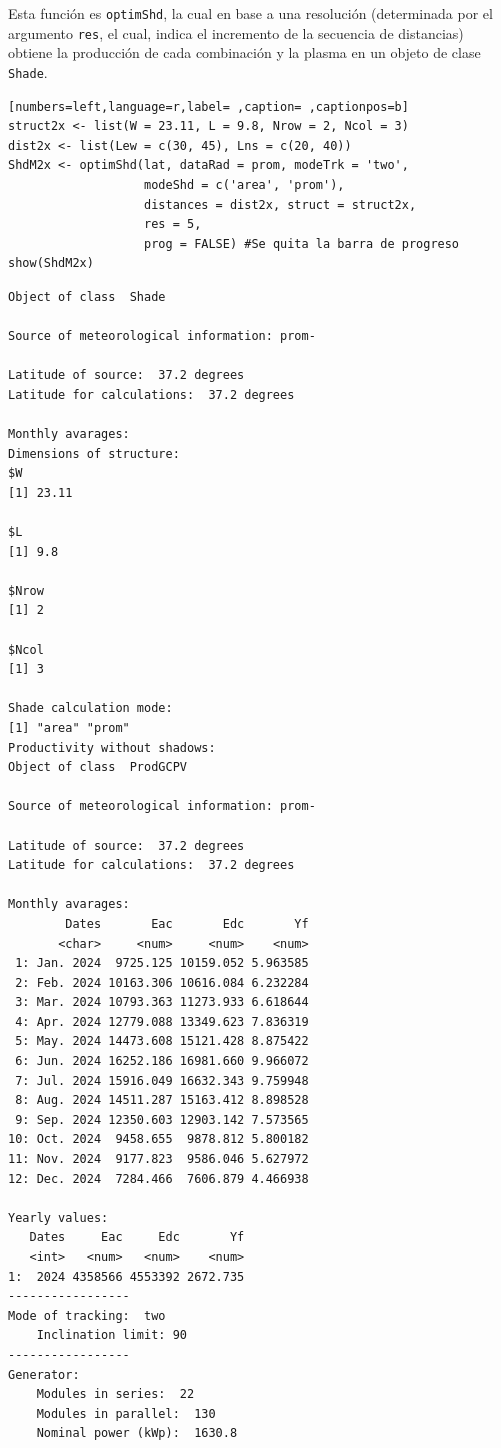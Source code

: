 Esta función es \texttt{optimShd}, la cual en base a una resolución (determinada por el argumento \texttt{res}, el cual, indica el incremento de la secuencia de distancias) obtiene la producción de cada combinación y la plasma en un objeto de clase \texttt{Shade}.
\begin{lstlisting}[numbers=left,language=r,label= ,caption= ,captionpos=b]
struct2x <- list(W = 23.11, L = 9.8, Nrow = 2, Ncol = 3)
dist2x <- list(Lew = c(30, 45), Lns = c(20, 40))
ShdM2x <- optimShd(lat, dataRad = prom, modeTrk = 'two',
                   modeShd = c('area', 'prom'),
                   distances = dist2x, struct = struct2x,
                   res = 5,
                   prog = FALSE) #Se quita la barra de progreso
show(ShdM2x)
\end{lstlisting}

\begin{verbatim}
Object of class  Shade 

Source of meteorological information: prom- 

Latitude of source:  37.2 degrees
Latitude for calculations:  37.2 degrees

Monthly avarages:
Dimensions of structure:
$W
[1] 23.11

$L
[1] 9.8

$Nrow
[1] 2

$Ncol
[1] 3

Shade calculation mode:
[1] "area" "prom"
Productivity without shadows:
Object of class  ProdGCPV 

Source of meteorological information: prom- 

Latitude of source:  37.2 degrees
Latitude for calculations:  37.2 degrees

Monthly avarages:
        Dates       Eac       Edc       Yf
       <char>     <num>     <num>    <num>
 1: Jan. 2024  9725.125 10159.052 5.963585
 2: Feb. 2024 10163.306 10616.084 6.232284
 3: Mar. 2024 10793.363 11273.933 6.618644
 4: Apr. 2024 12779.088 13349.623 7.836319
 5: May. 2024 14473.608 15121.428 8.875422
 6: Jun. 2024 16252.186 16981.660 9.966072
 7: Jul. 2024 15916.049 16632.343 9.759948
 8: Aug. 2024 14511.287 15163.412 8.898528
 9: Sep. 2024 12350.603 12903.142 7.573565
10: Oct. 2024  9458.655  9878.812 5.800182
11: Nov. 2024  9177.823  9586.046 5.627972
12: Dec. 2024  7284.466  7606.879 4.466938

Yearly values:
   Dates     Eac     Edc       Yf
   <int>   <num>   <num>    <num>
1:  2024 4358566 4553392 2672.735
-----------------
Mode of tracking:  two 
    Inclination limit: 90 
-----------------
Generator:
    Modules in series:  22 
    Modules in parallel:  130 
    Nominal power (kWp):  1630.8 


\end{verbatim}
